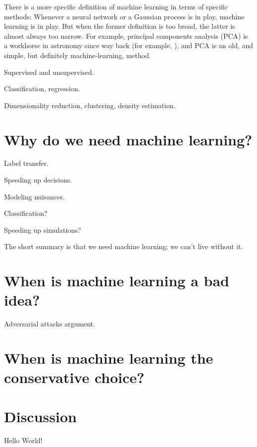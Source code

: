 \documentclass[modern]{aastex631}
\begin{document}
There is a more specific definition of machine learning in terms of specific methods:
Whenever a neural network or a Gaussian process is in play, machine learning is in play.
But when the former definition is too broad, the latter is almost always too narrow.
For example, principal components analysis (PCA) is a workhorse in astronomy since way back (for example, \citealt{pcaredshift}), and PCA is an old, and simple, but definitely machine-learning, method.

Supervised and unsupervised.

Classification, regression.

Dimensionality reduction, clustering, density estimation.

\section{Why do we need machine learning?}

Label transfer.

Speeding up decisions.

Modeling nuisances.

Classification?

Speeding up simulations?

The short summary is that we need machine learning; we can't live without it.

\section{When is machine learning a bad idea?}

Adversarial attacks argument.

\section{When is machine learning the conservative choice?}

\section{Discussion}\label{sec:discussion}

Hello World!

{}

\end{document}
